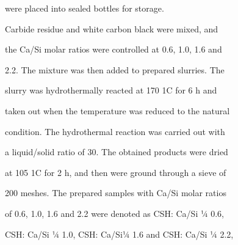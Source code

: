 \documentclass[a4paper,portrait,12pt]{article}
\begin{document}
\begin{flushleft}
were placed into sealed bottles for storage.
\end{flushleft}


\begin{flushleft}
Carbide residue and white carbon black were mixed, and
\end{flushleft}


\begin{flushleft}
the Ca/Si molar ratios were controlled at 0.6, 1.0, 1.6 and
\end{flushleft}


\begin{flushleft}
2.2. The mixture was then added to prepared slurries. The
\end{flushleft}


\begin{flushleft}
slurry was hydrothermally reacted at 170 1C for 6 h and
\end{flushleft}


\begin{flushleft}
taken out when the temperature was reduced to the natural
\end{flushleft}





\begin{flushleft}
condition. The hydrothermal reaction was carried out with
\end{flushleft}


\begin{flushleft}
a liquid/solid ratio of 30. The obtained products were dried
\end{flushleft}


\begin{flushleft}
at 105 1C for 2 h, and then were ground through a sieve of
\end{flushleft}


\begin{flushleft}
200 meshes. The prepared samples with Ca/Si molar ratios
\end{flushleft}


\begin{flushleft}
of 0.6, 1.0, 1.6 and 2.2 were denoted as CSH: Ca/Si ¼ 0.6,
\end{flushleft}


\begin{flushleft}
CSH: Ca/Si ¼ 1.0, CSH: Ca/Si¼ 1.6 and CSH: Ca/Si ¼ 2.2,
\end{flushleft}
\end{document}
